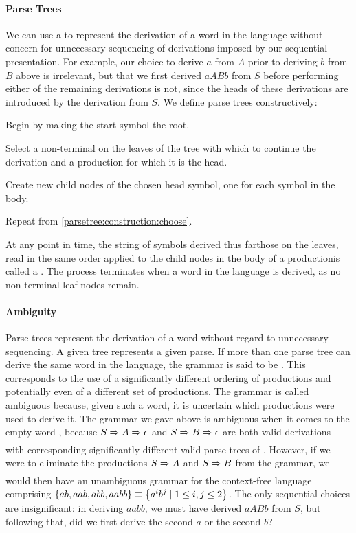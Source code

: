 \paragraph{Parse Trees} We can use a  to represent the derivation of a word in the language without concern for unnecessary sequencing of derivations imposed by our sequential presentation. For example, our choice to derive $a$ from $A$ prior to deriving $b$ from $B$ above is irrelevant, but that we first derived $aABb$ from $S$ before performing either of the remaining derivations is not, since the heads of these derivations are introduced by the derivation from $S$. We define parse trees constructively: 
\begin{aenumerate}
\item Begin by making the start symbol the root.
\item\label{parsetree:construction:choose} Select a non-terminal on the leaves of the tree with which to continue the derivation and a production for which it is the head.
\item Create new child nodes of the chosen head symbol, one for each symbol in the body.
\item Repeat from \ref{parsetree:construction:choose}.
\end{aenumerate}
At any point in time, the string of symbols derived thus far\empause those on the leaves, read in the same order applied to the child nodes in the body of a production\empause is called a . The process terminates when a word in the language is derived, as no non-terminal leaf nodes remain.

\paragraph{Ambiguity} Parse trees represent the derivation of a word without regard to unnecessary sequencing. A given tree represents a given parse. If more than one parse tree can derive the same word in the language, the grammar is said to be . This corresponds to the use of a significantly different ordering of productions and potentially even of a different set of productions. The grammar is called ambiguous because, given such a word, it is uncertain which productions were used to derive it. The grammar we gave above is ambiguous when it comes to the empty word \emptyword, because $S \derives A \derives \emptyword$ and $S \derives B \derives \emptyword$ are both valid derivations with corresponding significantly different valid parse trees of \emptyword. However, if we were to eliminate the productions $S \derives A$ and $S \derives B$ from the grammar, we would then have an unambiguous grammar for the context-free language comprising $\left\{ ab, aab, abb, aabb \right\} \equiv \left\{ a^{i}b^{j} \mid 1 \leq i, j \leq 2 \right\}$. The only sequential choices are insignificant: in deriving $aabb$, we must have derived $aABb$ from $S$, but following that, did we first derive the second $a$ or the second $b$?

